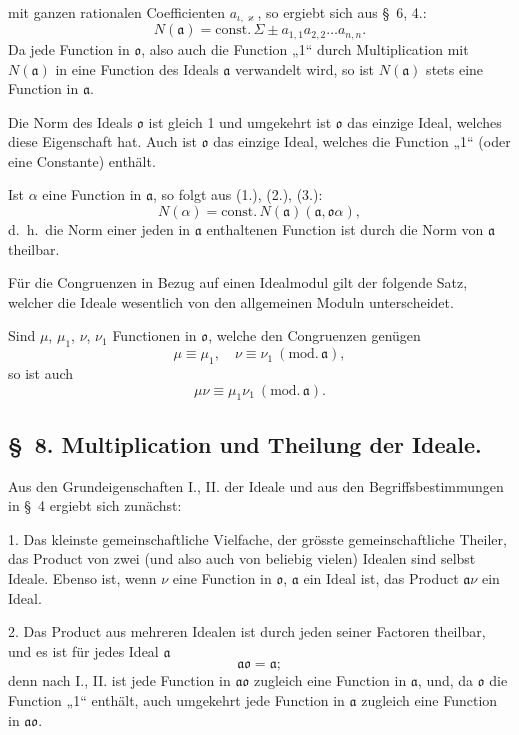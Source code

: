 \documentclass{article}
\begin{document}
mit ganzen rationalen Coefficienten $a_{\iota,\varkappa}$, so ergiebt sich aus §~6, 4.:
\[ N(\mathfrak{a}) = \text{const.}\,\Sigma \pm a_{1,1}a_{2,2}\ldots a_{n,n}. \tag{3.} \]
Da jede Function in $\mathfrak{o}$, also auch die Function „1“ durch Multiplication mit $N(\mathfrak{a})$ in eine Function des Ideals $\mathfrak{a}$ verwandelt wird, so ist $N(\mathfrak{a})$ stets eine Function in $\mathfrak{a}$.

Die Norm des Ideals $\mathfrak{o}$ ist gleich 1 und umgekehrt ist $\mathfrak{o}$ das einzige Ideal, welches diese Eigenschaft hat. Auch ist $\mathfrak{o}$ das einzige Ideal, welches die Function „1“ (oder eine Constante) enthält.

Ist $\alpha$ eine Function in $\mathfrak{a}$, so folgt aus (1.), (2.), (3.):
\[ N(\alpha) = \text{const.}\,N(\mathfrak{a})(\mathfrak{a}, \mathfrak{o}\alpha), \tag{4.} \]
d.\ h.\ die Norm einer jeden in $\mathfrak{a}$ enthaltenen Function ist durch die Norm von $\mathfrak{a}$ theilbar.

Für die Congruenzen in Bezug auf einen Idealmodul gilt der folgende Satz, welcher die Ideale wesentlich von den allgemeinen Moduln unterscheidet.

Sind $\mu$, $\mu_{1}$, $\nu$, $\nu_{1}$ Functionen in $\mathfrak{o}$, welche den Congruenzen genügen
\[ \mu \equiv \mu_{1}, \quad \nu \equiv \nu_{1} \ (\text{mod.}\,\mathfrak{a}), \]
so ist auch
\[ \mu\nu \equiv \mu_{1}\nu_{1} \ (\text{mod.}\,\mathfrak{a}). \]

\subsection*{§~8. Multiplication und Theilung der Ideale.}

Aus den Grundeigenschaften I., II. der Ideale und aus den Begriffsbestimmungen in §~4 ergiebt sich zunächst:

1. Das kleinste gemeinschaftliche Vielfache, der grösste gemeinschaftliche Theiler, das Product von zwei (und also auch von beliebig vielen) Idealen sind selbst Ideale. Ebenso ist, wenn $\nu$ eine Function in $\mathfrak{o}$, $\mathfrak{a}$ ein Ideal ist, das Product $\mathfrak{a}\nu$ ein Ideal.

2. Das Product aus mehreren Idealen ist durch jeden seiner Factoren theilbar, und es ist für jedes Ideal $\mathfrak{a}$
\[ \mathfrak{a}\mathfrak{o} = \mathfrak{a}; \]
denn nach I., II. ist jede Function in $\mathfrak{a}\mathfrak{o}$ zugleich eine Function in $\mathfrak{a}$, und, da $\mathfrak{o}$ die Function „1“ enthält, auch umgekehrt jede Function in $\mathfrak{a}$ zugleich eine Function in $\mathfrak{a}\mathfrak{o}$.
\end{document}
